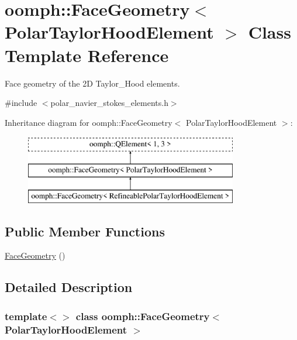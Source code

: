 \hypertarget{classoomph_1_1FaceGeometry_3_01PolarTaylorHoodElement_01_4}{}\section{oomph\+:\+:Face\+Geometry$<$ Polar\+Taylor\+Hood\+Element $>$ Class Template Reference}
\label{classoomph_1_1FaceGeometry_3_01PolarTaylorHoodElement_01_4}


Face geometry of the 2D Taylor\+\_\+\+Hood elements.  




{\ttfamily \#include $<$polar\+\_\+navier\+\_\+stokes\+\_\+elements.\+h$>$}

Inheritance diagram for oomph\+:\+:Face\+Geometry$<$ Polar\+Taylor\+Hood\+Element $>$\+:\begin{figure}[H]
\begin{center}
\leavevmode
\includegraphics[height=3.000000cm]{classoomph_1_1FaceGeometry_3_01PolarTaylorHoodElement_01_4}
\end{center}
\end{figure}
\subsection*{Public Member Functions}
\begin{DoxyCompactItemize}
\item 
\hyperlink{classoomph_1_1FaceGeometry_3_01PolarTaylorHoodElement_01_4_afd83be3036e0f17a9c78bb4082393ebc}{Face\+Geometry} ()
\end{DoxyCompactItemize}


\subsection{Detailed Description}
\subsubsection*{template$<$$>$\newline
class oomph\+::\+Face\+Geometry$<$ Polar\+Taylor\+Hood\+Element $>$}


